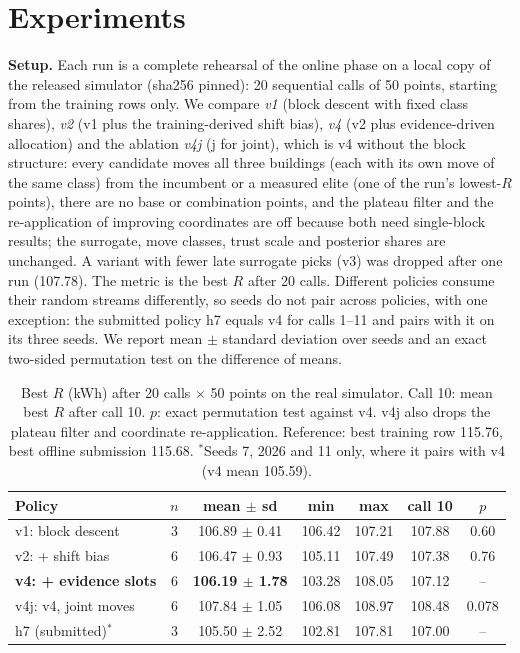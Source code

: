 \section{Experiments}
\label{sec:exp}
\textbf{Setup.} Each run is a complete rehearsal of the online phase on a local copy of the released simulator (sha256
pinned): 20 sequential calls of 50 points, starting from the training rows only. We compare
\emph{v1} (block descent with fixed class shares), \emph{v2} (v1 plus the training-derived shift bias), \emph{v4}
(v2 plus evidence-driven allocation) and the ablation \emph{v4j} (j for joint), which is v4 without the block
structure: every candidate moves all three buildings (each with its own move of the same class) from the incumbent
or a measured elite (one of the run's lowest-$R$ points), there are no base or combination points, and the plateau
filter and the re-application of improving coordinates are off because both need single-block results; the surrogate,
move classes, trust scale and posterior shares are unchanged. A variant with fewer late surrogate picks (v3) was
dropped after one run (107.78). The metric is the best $R$ after 20 calls. Different policies consume their random
streams differently, so seeds do not pair across policies, with one exception: the submitted policy h7 equals v4 for
calls 1--11 and pairs with it on its three seeds. We report mean $\pm$ standard deviation over seeds and an exact
two-sided permutation test on the difference of means.

\begin{table}[t]
\centering
\caption{Best $R$ (kWh) after 20 calls $\times$ 50 points on the real simulator. Call 10: mean best $R$ after call 10.
$p$: exact permutation test against v4. v4j also drops the plateau filter and coordinate re-application.
Reference: best training row 115.76, best offline submission 115.68. $^\ast$Seeds 7, 2026 and 11 only, where it
pairs with v4 (v4 mean 105.59).}
\label{tab:main}
\setlength{\tabcolsep}{2.6pt}
\begin{tabular}{lcccccc}
\toprule
Policy & $n$ & mean $\pm$ sd & min & max & call 10 & $p$\\
\midrule
v1: block descent & 3 & 106.89 $\pm$ 0.41 & 106.42 & 107.21 & 107.88 & 0.60\\
v2: + shift bias & 6 & 106.47 $\pm$ 0.93 & 105.11 & 107.49 & 107.38 & 0.76\\
\textbf{v4: + evidence slots} & 6 & \textbf{106.19 $\pm$ 1.78} & 103.28 & 108.05 & 107.12 & --\\
v4j: v4, joint moves & 6 & 107.84 $\pm$ 1.05 & 106.08 & 108.97 & 108.48 & 0.078\\
\midrule
h7 (submitted)$^\ast$ & 3 & 105.50 $\pm$ 2.52 & 102.81 & 107.81 & 107.00 & --\\
\bottomrule
\end{tabular}
\end{table}


